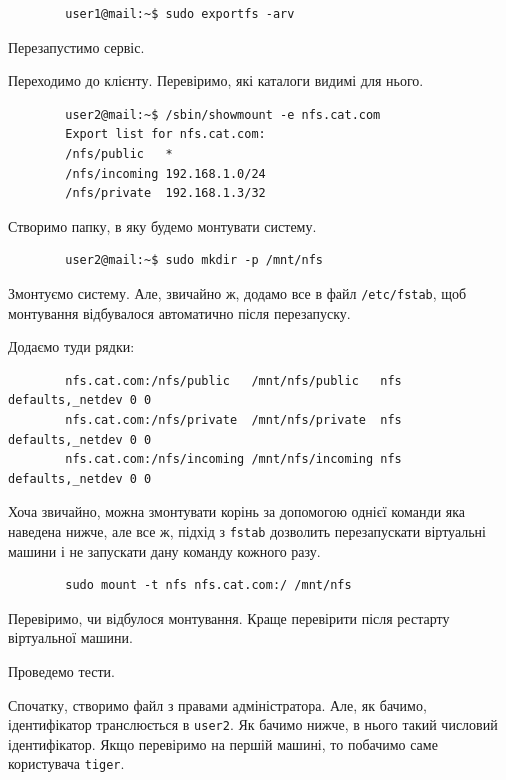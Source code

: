 \documentclass[14pt, a4paper]{extreport}
\begin{document}
	\begin{verbatim}
		user1@mail:~$ sudo exportfs -arv
	\end{verbatim}
	
	Перезапустимо сервіс. \sideat{[VM 1]}
	
	
	Переходимо до клієнту. Перевіримо, які каталоги видимі для нього. \sideat{[VM 2]}
	
	\begin{verbatim}
		user2@mail:~$ /sbin/showmount -e nfs.cat.com
		Export list for nfs.cat.com:
		/nfs/public   *
		/nfs/incoming 192.168.1.0/24
		/nfs/private  192.168.1.3/32
	\end{verbatim}
	
	Створимо папку, в яку будемо монтувати систему. \sideat{[VM 2]}
	
	\begin{verbatim}
		user2@mail:~$ sudo mkdir -p /mnt/nfs
	\end{verbatim}
	
	Змонтуємо систему. Але, звичайно ж, додамо все в файл \texttt{/etc/fstab}, щоб монтування відбувалося автоматично після перезапуску.
	
	Додаємо туди рядки: \sideat{[VM 2]}
	
	\begin{verbatim}
		nfs.cat.com:/nfs/public   /mnt/nfs/public   nfs defaults,_netdev 0 0
		nfs.cat.com:/nfs/private  /mnt/nfs/private  nfs defaults,_netdev 0 0
		nfs.cat.com:/nfs/incoming /mnt/nfs/incoming nfs defaults,_netdev 0 0
	\end{verbatim}
	
	Хоча звичайно, можна змонтувати корінь за допомогою однієї команди яка наведена нижче, але все ж, підхід з \texttt{fstab} дозволить перезапускати віртуальні машини і не запускати дану команду кожного разу.
	
	\begin{verbatim}
		sudo mount -t nfs nfs.cat.com:/ /mnt/nfs
	\end{verbatim}
	
	Перевіримо, чи відбулося монтування. Краще перевірити після рестарту віртуальної машини.
	
	
	Проведемо тести. 
	
	Спочатку, створимо файл з правами адміністратора. Але, як бачимо, ідентифікатор транслюється в \texttt{user2}. Як бачимо нижче, в нього такий числовий ідентифікатор. Якщо перевіримо на першій машині, то побачимо саме користувача \texttt{tiger}.
	
\end{document}
